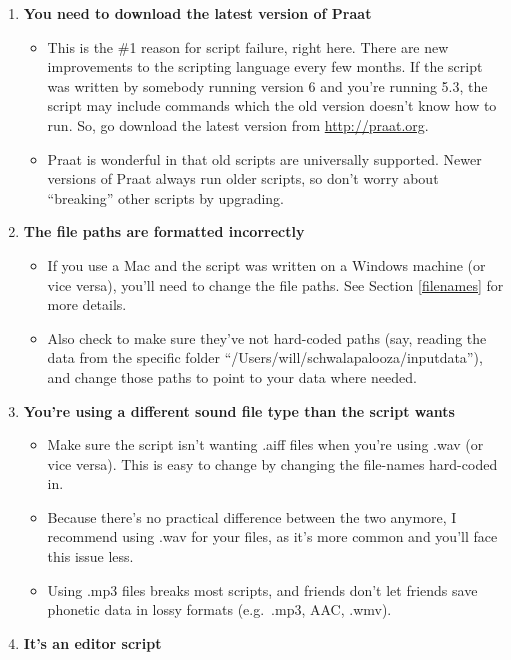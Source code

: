 \documentclass[11pt]{article}
\def\tightlist{}
\begin{document}
\begin{enumerate}
\def\labelenumi{\arabic{enumi}.}
\tightlist
\item
  \textbf{You need to download the latest version of Praat}

  \begin{itemize}
  \tightlist
  \item
    This is the \#1 reason for script failure, right here. There are new
    improvements to the scripting language every few months. If the
    script was written by somebody running version 6 and you're running
    5.3, the script may include commands which the old version doesn't
    know how to run. So, go download the latest version from
    \url{http://praat.org}.
  \item
    Praat is wonderful in that old scripts are universally supported.
    Newer versions of Praat always run older scripts, so don't worry
    about ``breaking'' other scripts by upgrading.
  \end{itemize}
\item
  \textbf{The file paths are formatted incorrectly}

  \begin{itemize}
  \tightlist
  \item
    If you use a Mac and the script was written on a Windows machine (or
    vice versa), you'll need to change the file paths. See Section
    \ref{filenames} for more details.
  \item
    Also check to make sure they've not hard-coded paths (say, reading
    the data from the specific folder
    ``/Users/will/schwalapalooza/inputdata''), and change those paths to
    point to your data where needed.
  \end{itemize}
\item
  \textbf{You're using a different sound file type than the script
  wants}

  \begin{itemize}
  \tightlist
  \item
    Make sure the script isn't wanting .aiff files when you're using
    .wav (or vice versa). This is easy to change by changing the
    file-names hard-coded in.
  \item
    Because there's no practical difference between the two anymore, I
    recommend using .wav for your files, as it's more common and you'll
    face this issue less.
  \item
    Using .mp3 files breaks most scripts, and friends don't let friends
    save phonetic data in lossy formats (e.g.~.mp3, AAC, .wmv).
  \end{itemize}
\item
  \textbf{It's an editor script}


\end{enumerate}
\end{document}

